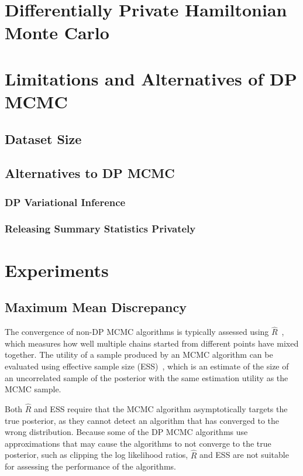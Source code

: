 \documentclass[english,twoside,openright]{HYgraduMLDS}
\begin{document}
\chapter{Differentially Private Hamiltonian Monte Carlo}

\chapter{Limitations and Alternatives of DP MCMC}

\section{Dataset Size}

\section{Alternatives to DP MCMC}

\subsection{DP Variational Inference}
\subsection{Releasing Summary Statistics Privately}

\chapter{Experiments}

\section{Maximum Mean Discrepancy}

The convergence of non-DP MCMC algorithms is typically assessed using 
\(\hat{R}\)~\cite{BDA}, which measures how well multiple chains started from 
different points have mixed together. The utility of a sample produced by an 
MCMC algorithm can be evaluated using effective sample size (ESS)~\cite{BDA},
which is an estimate of the size of an uncorrelated sample of the posterior
with the same estimation utility as the MCMC sample. 

Both \(\hat{R}\) and ESS require that the MCMC algorithm asymptotically targets 
the true posterior, as they cannot detect an algorithm that has converged to the 
wrong distribution. Because some of the DP MCMC algorithms use approximations 
that may cause the algorithms to not converge to the true posterior, 
such as clipping the log likelihood ratios, \(\hat{R}\) and ESS are not suitable 
for assessing the performance of the algorithms.
\end{document}
